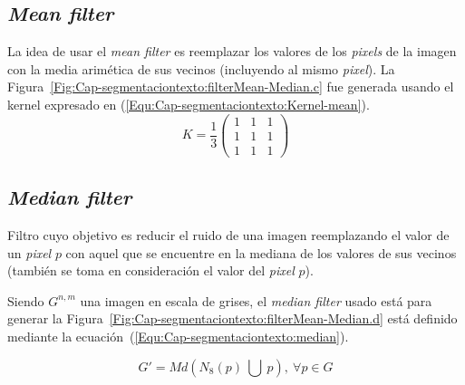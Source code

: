 \subsection{\textit{Mean filter}}
La idea de usar el \textit{mean filter} es reemplazar los valores de los 
\textit{pixels} de la imagen con la media arimética de sus vecinos (incluyendo
al mismo \textit{pixel}). La
Figura~\ref{Fig:Cap-segmentaciontexto:filterMean-Median.c} fue generada usando
el kernel expresado en (\ref{Equ:Cap-segmentaciontexto:Kernel-mean}).
\begin{equation}
K =  \frac{1}{3} \left( \begin{array}{ccc}
1 & 1 & 1 \\
1 & 1 & 1 \\
1 & 1 & 1 \end{array} \right)
\label{Equ:Cap-segmentaciontexto:Kernel-mean}
\end{equation}

\subsection{\textit{Median filter}}
Filtro cuyo objetivo es reducir el ruido de una imagen reemplazando el valor 
de un \textit{pixel} $p$ con aquel que se encuentre en la mediana de los valores
de sus vecinos (también se toma en consideración el valor del \textit{pixel}
$p$). 

Siendo $G^{n,m}$ una imagen en escala de grises, el \textit{median filter}
usado está para generar la
Figura~\ref{Fig:Cap-segmentaciontexto:filterMean-Median.d} está definido
mediante la ecuación~(\ref{Equ:Cap-segmentaciontexto:median}).

\begin{equation}
	G' = Md \left( N_8(p)~ \bigcup ~p \right), ~\forall p \in G
	\label{Equ:Cap-segmentaciontexto:median}
\end{equation}

